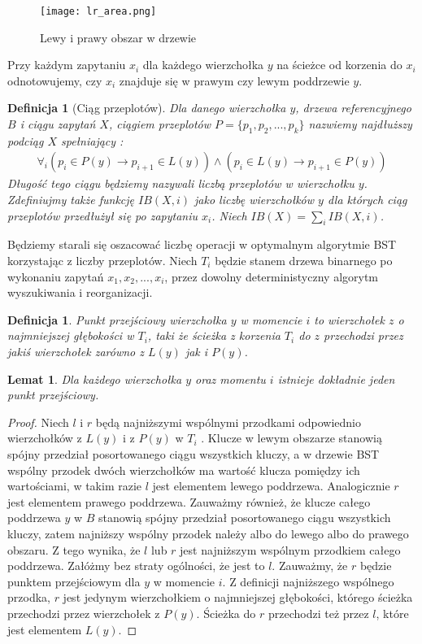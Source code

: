 \documentclass[declaration,shortabstract]{iithesis}
\newcounter{thm}[section]
\theoremstyle{thm}
\newtheorem{definition}[thm]{Definicja}
\theoremstyle{remark}
\theoremstyle{plain}
\theoremstyle{plain}
\theoremstyle{plain}
\newtheorem{lemma}[thm]{Lemat}
\begin{document}
\begin{figure}[H]  
\centering
\texttt{[image: lr\_area.png]}
\caption{Lewy i prawy obszar w drzewie}  
\end{figure} 


Przy każdym zapytaniu \(x_i\) dla każdego wierzchołka $y$ na ścieżce od korzenia do \(x_i\) odnotowujemy, czy \(x_i\) znajduje się w prawym czy lewym poddrzewie $y$.  

\begin{definition}[Ciąg przeplotów] 
Dla danego wierzchołka \(y\), drzewa referencyjnego \(B\) i ciągu zapytań \(X\), ciągiem przeplotów $P = \{p_1, p_2,..., p_k\}$ nazwiemy najdłuższy podciąg $X$ spełniający : \\ 
\begin{align*}
\forall_i (p_i \in P(y) \rightarrow p_{i+1} \in L(y)) \wedge (p_i \in L(y) \rightarrow p_{i+1} \in P(y))
\end{align*}
Długość tego ciągu będziemy nazywali liczbą przeplotów w wierzchołku $y$.\\
Zdefiniujmy także funkcję \(IB(X, i)\) jako liczbę wierzchołków $y$ dla których ciąg przeplotów przedłużył się po zapytaniu $x_i$. Niech \(IB(X) = \sum_i IB(X, i)\). 
\end{definition}  

Będziemy starali się oszacować liczbę operacji w optymalnym algorytmie BST korzystając z liczby przeplotów. Niech \(T_i\) będzie stanem drzewa binarnego po wykonaniu zapytań \( x_1, x_2, ..., x_i\), przez dowolny deterministyczny algorytm wyszukiwania i reorganizacji.  

\begin{definition} 
Punkt przejściowy wierzchołka $y$ w momencie $i$ to wierzchołek $z$ o najmniejszej głębokości w \( T_i\), taki że ścieżka z korzenia $T_i$ do $z$ przechodzi przez jakiś wierzchołek zarówno z $L(y)$ jak i $P(y)$.
\end{definition}  

\begin{lemma} 
Dla każdego wierzchołka $y$ oraz momentu $i$ istnieje dokładnie jeden punkt przejściowy. 
\end{lemma} 
\begin{proof} 
Niech $l$ i $r$ będą najniższymi wspólnymi przodkami odpowiednio wierzchołków z $L(y)$ i z $P(y)$ w $T_i$ . Klucze w lewym obszarze stanowią spójny przedział posortowanego ciągu wszystkich kluczy, a w drzewie BST wspólny przodek dwóch wierzchołków ma wartość klucza pomiędzy ich wartościami, w takim razie $l$ jest elementem lewego poddrzewa. Analogicznie $r$ jest elementem prawego poddrzewa. Zauważmy również, że klucze całego poddrzewa $y$ w $B$ stanowią spójny przedział posortowanego ciągu wszystkich kluczy, zatem najniższy wspólny przodek należy albo do lewego albo do prawego obszaru. Z tego wynika, że $l$ lub $r$ jest najniższym wspólnym przodkiem całego poddrzewa. Załóżmy bez straty ogólności, że jest to $l$. Zauważmy, że $r$ będzie punktem przejściowym dla $y$ w momencie $i$. Z definicji najniższego wspólnego przodka, $r$ jest jedynym wierzchołkiem o najmniejszej głębokości, którego ścieżka przechodzi przez wierzchołek z $P(y)$. Ścieżka do $r$ przechodzi też przez $l$, które jest elementem $L(y)$. 
\end{proof}  
\end{document}
